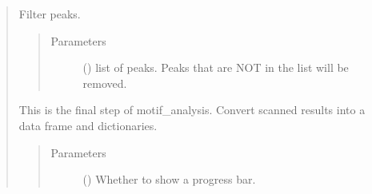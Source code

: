 \documentclass[letterpaper,10pt,english]{sphinxmanual}
\begin{document}
\begin{quote}
\begin{fulllineitems}
\begin{fulllineitems}
\begin{quote}
\begin{description}
\end{description}\end{quote}

\end{fulllineitems}


\begin{fulllineitems}
\label{\detokenize{modules/celloracle.motif_analysis:celloracle.motif_analysis.TFinfo.filter_peaks}}
Filter peaks.
\begin{quote}\begin{description}
\item[{Parameters}] \leavevmode
{} () \textendash{} list of peaks. Peaks that are NOT in the list will be removed.

\end{description}\end{quote}

\end{fulllineitems}


\begin{fulllineitems}
\label{\detokenize{modules/celloracle.motif_analysis:celloracle.motif_analysis.TFinfo.make_TFinfo_dataframe_and_dictionary}}
This is the final step of motif\_analysis.
Convert scanned results into a data frame and dictionaries.
\begin{quote}\begin{description}
\item[{Parameters}] \leavevmode
{} () \textendash{} Whether to show a progress bar.

\end{description}\end{quote}


\end{fulllineitems}
\end{fulllineitems}
\end{quote}
\end{document}
